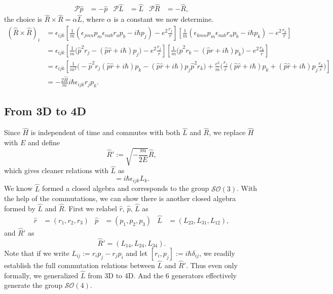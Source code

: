 \documentclass[a4paper,11pt]{article}
\theoremstyle{remark}
\theoremstyle{defn}
\begin{document}
\begin{align}
\mathcal{P}\hat{p} &= -\hat{p} & \mathcal{P}\hat{L} &= \hat{L} & \mathcal{P}\hat{R} &= -\hat{R},
\label{eq:parity}
\end{align}
the choice is $\hat{R}\times\hat{R} = \alpha\hat{L}$, where $\alpha$ is a constant we now determine.
\begin{equation}
\begin{split}
(\hat{R}\times\hat{R})_i 
&= \epsilon_{ijk}\left[\frac{1}{m}(\epsilon_{jmn}p_m\epsilon_{nab}r_ap_b-i\hbar p_j)-e^2\frac{r_j}{r}\right]
\left[\frac{1}{m}(\epsilon_{kmn}p_m\epsilon_{nab}r_ap_b-i\hbar p_k)-e^2\frac{r_k}{r}\right]\\
&= \epsilon_{ijk}\left[\frac{1}{m}\bigg(\hat{p}^2r_j-(\hat{p}\hat{r}+i\hbar) p_j\bigg)-e^2\frac{r_j}{r}\right]
\left[\frac{1}{m}\bigg(\hat{p}^2r_k-(\hat{p}\hat{r}+i\hbar) p_k\bigg)-e^2\frac{r_k}{r}\right]\\
&= \epsilon_{ijk}\left[\frac{1}{m^2}\bigg(-\hat{p}^2r_j(\hat{p}\hat{r}+i\hbar) p_k-(\hat{p}\hat{r}+i\hbar) p_j\hat{p}^2r_k\bigg)
+\frac{e^2}{m}\bigg(\frac{r_j}{r}(\hat{p}\hat{r}+i\hbar) p_k+(\hat{p}\hat{r}+i\hbar) p_j\frac{r_k}{r}\bigg)\right]\\
&= -\frac{2\hat{H}}{m}i\hbar\epsilon_{ijk}r_jp_k.
\end{split}
\end{equation}

\subsection{From 3D to 4D}
Since $\hat{H}$ is independent of time and commutes with both $\hat{L}$ and $\hat{R}$, we replace $\hat{H}$ with $E$ and define
\begin{equation}
\hat{R}':=\sqrt{-\frac{m}{2E}}\hat{R},
\end{equation}
which gives cleaner relations with $\hat{L}$ as 
\begin{equation}
[R'_i,R'_j]=i\hbar \epsilon_{ijk}L_k.
\end{equation}
We know $\hat{L}$ formed a closed algebra and corresponds to the group $\mathcal{SO}(3)$. With the help of the commutations, we
can show there is another closed algebra formed by $\hat{L}$ and $\hat{R}$. First we relabel $\hat{r},\,\hat{p},\,\hat{L}$ as
\begin{align}
\hat{r}&=(r_1,r_2,r_3) & \hat{p}&=(p_1,p_2,p_3) & \hat{L}&=(L_{23},L_{31},L_{12}),
\end{align}
and $\hat{R}'$ as 
\begin{equation}
\hat{R}' = (L_{14},L_{24},L_{34}).
\end{equation}
Note that if we write $L_{ij}:=r_ip_j-r_jp_i$ and let $[r_i,p_j]:=i\hbar \delta_{ij}$, we readily establish the full commutation 
relations between $\hat{L}$ and $\hat{R}'$. Thus even only formally, we generalized $\hat{L}$ from 3D to 4D. And the 6 generators
effectively generate the group $\mathcal{SO}(4)$.
\end{document}
